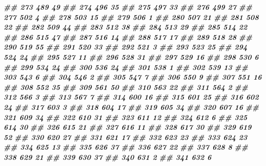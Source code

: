 \documentclass[
]{book}
\newenvironment{Shaded}{\begin{snugshade}}{\end{snugshade}}
\newcommand{\DocumentationTok}[1]{\textcolor[rgb]{0.56,0.35,0.01}{\textbf{\textit{#1}}}}
\theoremstyle{definition}
\theoremstyle{definition}
\theoremstyle{definition}
\theoremstyle{definition}
\theoremstyle{remark}
\begin{document}
\begin{Shaded}
\begin{Highlighting}[]
\DocumentationTok{\#\# 273    489 49}
\DocumentationTok{\#\# 274    496 35}
\DocumentationTok{\#\# 275    497 33}
\DocumentationTok{\#\# 276    499 27}
\DocumentationTok{\#\# 277    502  4}
\DocumentationTok{\#\# 278    503 15}
\DocumentationTok{\#\# 279    506  1}
\DocumentationTok{\#\# 280    507 21}
\DocumentationTok{\#\# 281    508 22}
\DocumentationTok{\#\# 282    509 44}
\DocumentationTok{\#\# 283    512 38}
\DocumentationTok{\#\# 284    513 29}
\DocumentationTok{\#\# 285    514 22}
\DocumentationTok{\#\# 286    515 47}
\DocumentationTok{\#\# 287    516 14}
\DocumentationTok{\#\# 288    517 17}
\DocumentationTok{\#\# 289    518 28}
\DocumentationTok{\#\# 290    519 55}
\DocumentationTok{\#\# 291    520 33}
\DocumentationTok{\#\# 292    521  3}
\DocumentationTok{\#\# 293    523 25}
\DocumentationTok{\#\# 294    524 24}
\DocumentationTok{\#\# 295    527 11}
\DocumentationTok{\#\# 296    528 31}
\DocumentationTok{\#\# 297    529 16}
\DocumentationTok{\#\# 298    530  6}
\DocumentationTok{\#\# 299    534 24}
\DocumentationTok{\#\# 300    536 24}
\DocumentationTok{\#\# 301    538  1}
\DocumentationTok{\#\# 302    539 13}
\DocumentationTok{\#\# 303    543  6}
\DocumentationTok{\#\# 304    546  2}
\DocumentationTok{\#\# 305    547  7}
\DocumentationTok{\#\# 306    550  9}
\DocumentationTok{\#\# 307    551 16}
\DocumentationTok{\#\# 308    552 35}
\DocumentationTok{\#\# 309    561 50}
\DocumentationTok{\#\# 310    563 22}
\DocumentationTok{\#\# 311    564  2}
\DocumentationTok{\#\# 312    566  3}
\DocumentationTok{\#\# 313    567  7}
\DocumentationTok{\#\# 314    600 16}
\DocumentationTok{\#\# 315    601 25}
\DocumentationTok{\#\# 316    602 24}
\DocumentationTok{\#\# 317    603  3}
\DocumentationTok{\#\# 318    604 17}
\DocumentationTok{\#\# 319    605 34}
\DocumentationTok{\#\# 320    607 16}
\DocumentationTok{\#\# 321    609 34}
\DocumentationTok{\#\# 322    610 31}
\DocumentationTok{\#\# 323    611 12}
\DocumentationTok{\#\# 324    612  6}
\DocumentationTok{\#\# 325    614 30}
\DocumentationTok{\#\# 326    615 21}
\DocumentationTok{\#\# 327    616 11}
\DocumentationTok{\#\# 328    617 30}
\DocumentationTok{\#\# 329    619 52}
\DocumentationTok{\#\# 330    620 27}
\DocumentationTok{\#\# 331    621 17}
\DocumentationTok{\#\# 332    623 23}
\DocumentationTok{\#\# 333    624 23}
\DocumentationTok{\#\# 334    625 13}
\DocumentationTok{\#\# 335    626 37}
\DocumentationTok{\#\# 336    627 22}
\DocumentationTok{\#\# 337    628  8}
\DocumentationTok{\#\# 338    629 21}
\DocumentationTok{\#\# 339    630 37}
\DocumentationTok{\#\# 340    631  2}
\DocumentationTok{\#\# 341    632  6}

\end{Highlighting}
\end{Shaded}
\end{document}
